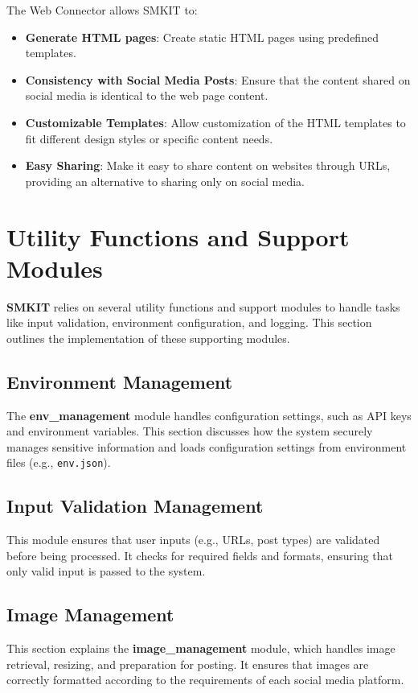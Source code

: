 The Web Connector allows SMKIT to:
\begin{itemize}
    \item \textbf{Generate HTML pages}: Create static HTML pages using predefined templates.
    \item \textbf{Consistency with Social Media Posts}: Ensure that the content shared on social media is identical to the web page content.
    \item \textbf{Customizable Templates}: Allow customization of the HTML templates to fit different design styles or specific content needs.
    \item \textbf{Easy Sharing}: Make it easy to share content on websites through URLs, providing an alternative to sharing only on social media.
\end{itemize}

\section{Utility Functions and Support Modules}
\label{sec:utility_functions_and_support_modules}
\textbf{SMKIT} relies on several utility functions and support modules to handle tasks like input validation, environment configuration, and logging. This section outlines the implementation of these supporting modules.

\subsection{Environment Management}
\label{subsec:Environment_management}
The \textbf{env\_management} module handles configuration settings, such as API keys and environment variables. This section discusses how the system securely manages sensitive information and loads configuration settings from environment files (e.g., \texttt{env.json}).

\subsection{Input Validation Management}
\label{subsec:input_validation_management}
This module ensures that user inputs (e.g., URLs, post types) are validated before being processed. It checks for required fields and formats, ensuring that only valid input is passed to the system.

\subsection{Image Management}
\label{subsec:image_management}
This section explains the \textbf{image\_management} module, which handles image retrieval, resizing, and preparation for posting. It ensures that images are correctly formatted according to the requirements of each social media platform.

